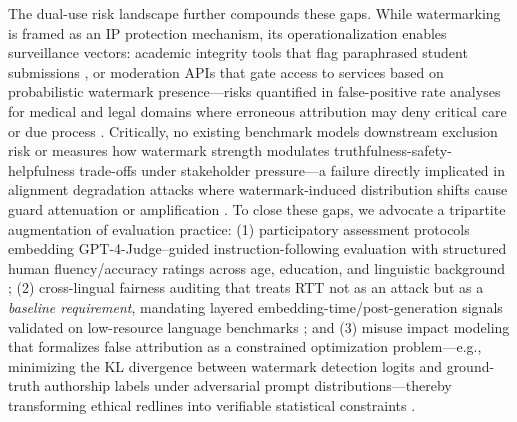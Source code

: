 \documentclass[11pt,a4paper]{article}
\begin{document}
The dual-use risk landscape further compounds these gaps. While watermarking is framed as an IP protection mechanism, its operationalization enables surveillance vectors: academic integrity tools that flag paraphrased student submissions \cite{doi:10.1609/aaai.v36i10.21415}, or moderation APIs that gate access to services based on probabilistic watermark presence---risks quantified in false-positive rate analyses for medical and legal domains where erroneous attribution may deny critical care or due process \cite{arxiv:2506.15975}. Critically, no existing benchmark models downstream exclusion risk or measures how watermark strength modulates truthfulness-safety-helpfulness trade-offs under stakeholder pressure---a failure directly implicated in alignment degradation attacks where watermark-induced distribution shifts cause guard attenuation or amplification \cite{arxiv:2306.09194}. To close these gaps, we advocate a tripartite augmentation of evaluation practice: (1) participatory assessment protocols embedding GPT-4-Judge--guided instruction-following evaluation with structured human fluency/accuracy ratings across age, education, and linguistic background \cite{arxiv:2403.04808,arxiv:2502.11598}; (2) cross-lingual fairness auditing that treats RTT not as an attack but as a \emph{baseline requirement}, mandating layered embedding-time/post-generation signals validated on low-resource language benchmarks \cite{arxiv:2601.11629}; and (3) misuse impact modeling that formalizes false attribution as a constrained optimization problem---e.g., minimizing the KL divergence between watermark detection logits and ground-truth authorship labels under adversarial prompt distributions---thereby transforming ethical redlines into verifiable statistical constraints \cite{arxiv:2506.15975,arxiv:2510.17000}.
\end{document}
